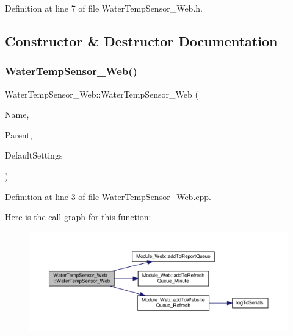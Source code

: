 Definition at line 7 of file Water\+Temp\+Sensor\+\_\+\+Web.\+h.



\subsection{Constructor \& Destructor Documentation}
\mbox{\label{class_water_temp_sensor___web_ae52b9b96ac5a1c38b4392df32fe4f2c8}} 
\subsubsection{\texorpdfstring{Water\+Temp\+Sensor\+\_\+\+Web()}{WaterTempSensor\_Web()}}
{\footnotesize\ttfamily Water\+Temp\+Sensor\+\_\+\+Web\+::\+Water\+Temp\+Sensor\+\_\+\+Web (\begin{DoxyParamCaption}\item[{const \+\_\+\+\_\+\+Flash\+String\+Helper $\ast$}]{Name,  }\item[{\hyperlink{class_module___web}{Module\+\_\+\+Web} $\ast$}]{Parent,  }\item[{\hyperlink{struct_settings_1_1_water_temp_sensor_settings}{Settings\+::\+Water\+Temp\+Sensor\+Settings} $\ast$}]{Default\+Settings }\end{DoxyParamCaption})}



Definition at line 3 of file Water\+Temp\+Sensor\+\_\+\+Web.\+cpp.

Here is the call graph for this function\+:
\nopagebreak
\begin{figure}[H]
\begin{center}
\leavevmode
\includegraphics[width=350pt]{class_water_temp_sensor___web_ae52b9b96ac5a1c38b4392df32fe4f2c8_cgraph}
\end{center}
\end{figure}


